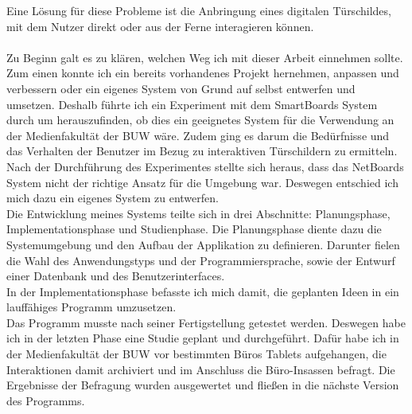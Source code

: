 Eine Lösung für diese Probleme ist die Anbringung eines digitalen Türschildes, mit dem Nutzer direkt oder aus der Ferne interagieren können.
\\
\\
Zu Beginn galt es zu klären, welchen Weg ich mit dieser Arbeit einnehmen sollte. Zum einen konnte ich ein bereits vorhandenes Projekt hernehmen, anpassen und verbessern oder ein eigenes System von Grund auf selbst entwerfen und umsetzen.
Deshalb führte ich ein Experiment mit dem SmartBoards System\cite{wood:2014,netboards:website} durch um herauszufinden, ob dies ein geeignetes System für die Verwendung an der Medienfakultät der BUW wäre. Zudem ging es darum die Bedürfnisse und das Verhalten der Benutzer im Bezug zu interaktiven Türschildern zu ermitteln.\\
Nach der Durchführung des Experimentes stellte sich heraus, dass das NetBoards System nicht der richtige Ansatz für die Umgebung war. Deswegen entschied ich mich dazu ein eigenes System zu entwerfen.\\
Die Entwicklung meines Systems teilte sich in drei Abschnitte: Planungsphase, Implementationsphase und Studienphase.
Die Planungsphase diente dazu die Systemumgebung und den Aufbau der Applikation zu definieren.
Darunter fielen die Wahl des Anwendungstyps und der Programmiersprache, sowie der Entwurf einer Datenbank und des Benutzerinterfaces.\\
In der Implementationsphase befasste ich mich damit, die geplanten Ideen in ein lauffähiges Programm umzusetzen.\\
Das Programm musste nach seiner Fertigstellung getestet werden. Deswegen habe ich in der letzten Phase eine Studie geplant und durchgeführt. Dafür habe ich in der Medienfakultät der BUW vor bestimmten Büros Tablets aufgehangen, die Interaktionen damit archiviert und im Anschluss die Büro-Insassen befragt. Die Ergebnisse der Befragung wurden ausgewertet und fließen in die nächste Version des Programms.